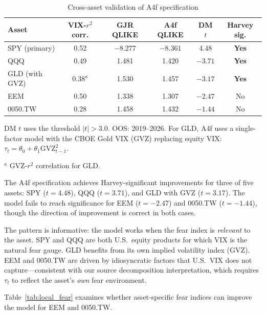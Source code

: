 \documentclass[12pt,a4paper]{article}
\begin{document}
\begin{table}[H]
\centering
\caption{Cross-asset validation of A4f specification}
\label{tab:cross_asset}
\begin{threeparttable}
\begin{tabular}{@{}lccccc@{}}
\toprule
Asset & VIX-$r^2$ corr. & GJR QLIKE & A4f QLIKE & DM $t$ & Harvey sig. \\
\midrule
SPY (primary) & 0.52 & $-8.277$ & $-8.361$ & 4.48 & \textbf{Yes} \\
QQQ & 0.49 & 1.481 & 1.420 & $-3.71$ & \textbf{Yes} \\
GLD (with GVZ) & 0.38$^a$ & 1.530 & 1.457 & $-3.17$ & \textbf{Yes} \\
EEM & 0.50 & 1.338 & 1.307 & $-2.47$ & No \\
0050.TW & 0.28 & 1.458 & 1.432 & $-1.44$ & No \\
\bottomrule
\end{tabular}
\begin{tablenotes}
\footnotesize
\item DM $t$ uses the \citet{harvey2016} threshold $|t| > 3.0$. OOS: 2019--2026. For GLD, A4f uses a single-factor model with the CBOE Gold VIX (GVZ) replacing equity VIX: $\tau_t = \theta_0 + \theta_1 \mathrm{GVZ}_{t-1}^2$.
\item $^a$ GVZ-$r^2$ correlation for GLD.
\end{tablenotes}
\end{threeparttable}
\end{table}

The A4f specification achieves Harvey-significant improvements for three of five assets: SPY ($t = 4.48$), QQQ ($t = 3.71$), and GLD with GVZ ($t = 3.17$). The model fails to reach significance for EEM ($t = -2.47$) and 0050.TW ($t = -1.44$), though the direction of improvement is correct in both cases.

The pattern is informative: the model works when the fear index is \emph{relevant} to the asset. SPY and QQQ are both U.S.\ equity products for which VIX is the natural fear gauge. GLD benefits from its own implied volatility index (GVZ). EEM and 0050.TW are driven by idiosyncratic factors that U.S.\ VIX does not capture---consistent with our source decomposition interpretation, which requires $\tau_t$ to reflect the asset's \emph{own} fear environment.

Table~\ref{tab:local_fear} examines whether asset-specific fear indices can improve the model for EEM and 0050.TW.
\end{document}
